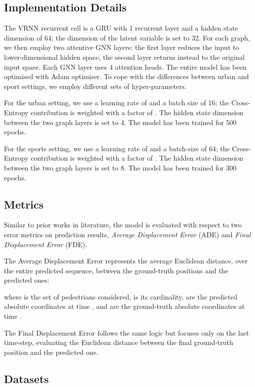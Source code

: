 \documentclass[10pt,a4paper,conference]{IEEEtran}
\begin{document}
\subsection{Implementation Details}
The VRNN recurrent cell is a GRU with 1 recurrent layer and a hidden state dimension of 64; the dimension of the latent variable is set to 32. For each graph, we then employ two attentive GNN layers: the first layer reduces the input to lower-dimensional hidden space, the second layer returns instead to the original input space. Each GNN layer uses 4 attention heads. The entire model has been optimised with Adam optimiser. To cope with the differences between urban and sport settings, we employ different sets of hyper-parameters.

For the urban setting, we use a learning rate of  and a batch size of 16; the Cross-Entropy contribution is weighted with a factor of . The hidden state dimension between the two graph layers is set to 4. The model has been trained for 500 epochs.

For the sports setting, we use a learning rate of  and a batch-size of 64; the Cross-Entropy contribution is weighted with a factor of . The hidden state dimension between the two graph layers is set to 8. The model has been trained for 300 epochs.


\subsection{Metrics}
Similar to prior works in literature, the model is evaluated with respect to two error metrics on prediction results, \textit{Average Displacement Error} (ADE) and \textit{Final Displacement Error} (FDE).

The Average Displacement Error represents the average Euclidean distance, over the entire predicted sequence, between the ground-truth positions and the predicted ones:



where  is the set of pedestrians considered,  is its cardinality,  are the predicted absolute coordinates at time , and  are the ground-truth absolute coordinates at time .

The Final Displacement Error follows the same logic but focuses only on the last time-step, evaluating the Euclidean distance between the final ground-truth position and the predicted one.




\subsection{Datasets}
\end{document}
